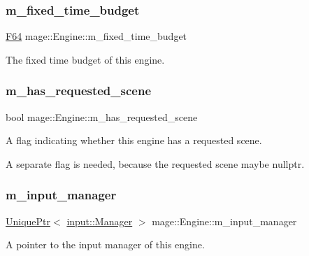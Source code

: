 \subsubsection{\texorpdfstring{m\+\_\+fixed\+\_\+time\+\_\+budget}{m\_fixed\_time\_budget}}
{\footnotesize\ttfamily \mbox{\hyperlink{namespacemage_ad26233bbec640deda836e572c1a23708}{F64}} mage\+::\+Engine\+::m\+\_\+fixed\+\_\+time\+\_\+budget\hspace{0.3cm}{\ttfamily [private]}}

The fixed time budget of this engine. \mbox{\label{classmage_1_1_engine_a96089c745442208679ea2e18cc6a6097}} 
\subsubsection{\texorpdfstring{m\+\_\+has\+\_\+requested\+\_\+scene}{m\_has\_requested\_scene}}
{\footnotesize\ttfamily bool mage\+::\+Engine\+::m\+\_\+has\+\_\+requested\+\_\+scene\hspace{0.3cm}{\ttfamily [private]}}

A flag indicating whether this engine has a requested scene.

A separate flag is needed, because the requested scene maybe {\ttfamily nullptr}. \mbox{\label{classmage_1_1_engine_a33db04e6d27802054769ff6a30911261}} 
\subsubsection{\texorpdfstring{m\+\_\+input\+\_\+manager}{m\_input\_manager}}
{\footnotesize\ttfamily \mbox{\hyperlink{namespacemage_a3316d7143a973e37adf1110f2e80ca31}{Unique\+Ptr}}$<$ \mbox{\hyperlink{classmage_1_1input_1_1_manager}{input\+::\+Manager}} $>$ mage\+::\+Engine\+::m\+\_\+input\+\_\+manager\hspace{0.3cm}{\ttfamily [private]}}

A pointer to the input manager of this engine. \mbox{\label{classmage_1_1_engine_a8359f22543fa6e39c948411e3023c397}} 

